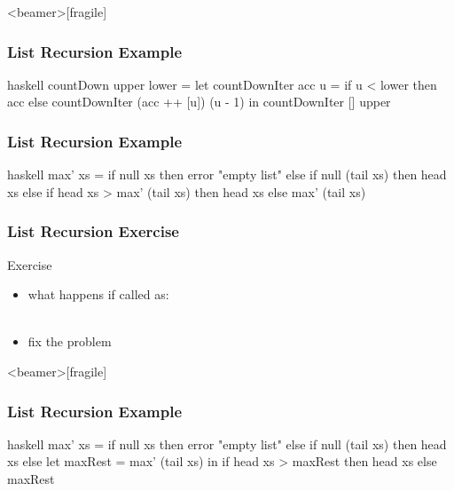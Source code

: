 \documentclass[dvipsnames]{beamer}
\theoremstyle{plain}
\begin{document}
\begin{frame}<beamer>[fragile]
  \frametitle{List Recursion Example}

  \begin{example}
    \begin{pygments}{haskell}
countDown upper lower =
    let
        countDownIter acc u =
            if u < lower
            then acc
            else countDownIter (acc ++ [u]) (u - 1)
    in
        countDownIter [] upper
    \end{pygments}

  \end{example}
\end{frame}

\begin{frame}[fragile]
  \frametitle{List Recursion Example}

  \begin{example}
    \pause
    \begin{pygments}{haskell}
max' xs =
    if null xs
    then error "empty list"
    else if null (tail xs)
         then head xs
         else if head xs > max' (tail xs)
              then head xs
              else max' (tail xs)
    \end{pygments}
  \end{example}
\end{frame}

\begin{frame}[fragile]
  \frametitle{List Recursion Exercise}

  \begin{block}{Exercise}
    \begin{itemize}
      \item what happens if called as:\\
        \\
      \item fix the problem
   \end{itemize}
  \end{block}
\end{frame}

\begin{frame}<beamer>[fragile]
  \frametitle{List Recursion Example}

  \begin{example}
    \begin{pygments}{haskell}
max' xs =
    if null xs
    then error "empty list"
    else if null (tail xs)
         then head xs
         else
             let
                 maxRest = max' (tail xs)
             in
                 if head xs > maxRest
                 then head xs
                 else maxRest
    \end{pygments}
  \end{example}
\end{frame}
\end{document}
